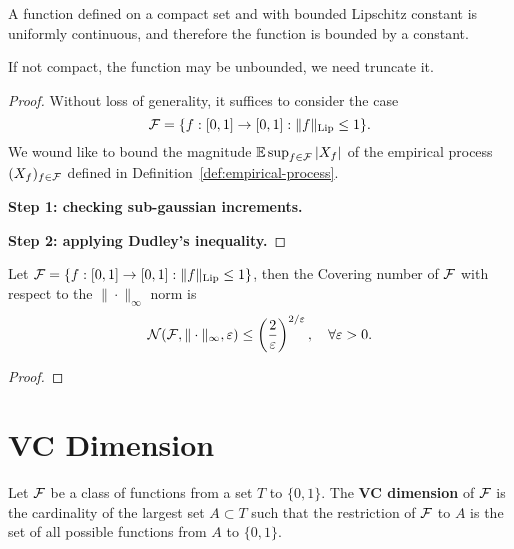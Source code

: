 A function defined on a compact set and with bounded Lipschitz constant is uniformly continuous, and therefore the function is bounded by a constant.

If not compact, the function may be unbounded, we need truncate it.

\begin{proof}
    Without loss of generality, it suffices to consider the case
    \begin{equation*}
        {\mathcal F}=\{f:[0,1]\to[0,1]:\|f\|_{\text{Lip}}\leq 1\}.
    \end{equation*}
    We wound like to bound the magnitude \({\mathbb E}\sup_{f\in{\mathcal F}}|X_{f}|\) of the empirical process \((X_{f})_{f\in{\mathcal F}}\) defined in Definition~\ref{def:empirical-process}.
    
    \textbf{Step 1: checking sub-gaussian increments.}

    \textbf{Step 2: applying Dudley's inequality.}
\end{proof}

\begin{lemma}
    Let \({\mathcal F}=\{f:[0,1]\to[0,1]:\|f\|_{\text{Lip}}\leq 1\}\), then the Covering number of \({\mathcal F}\) with respect to the \(\|\cdot\|_{\infty}\) norm is
    \begin{equation*}
        {\mathcal N}({\mathcal F},\|\cdot\|_{\infty},\varepsilon)\leq\left(\frac{2}{\varepsilon}\right)^{2/\varepsilon},\quad\forall\varepsilon>0.
    \end{equation*}
\end{lemma}

\begin{proof}
    
\end{proof}

\section{VC Dimension}

\begin{definition}[VC Dimension]
    Let \({\mathcal F}\) be a class of functions from a set \(T\) to \(\{0,1\}\). The \textbf{VC dimension} of \({\mathcal F}\) is the cardinality of the largest set \(A\subset T\) such that the restriction of \({\mathcal F}\) to \(A\) is the set of all possible functions from \(A\) to \(\{0,1\}\).
\end{definition}

\begin{example}[Intervals]
    
\end{example}

